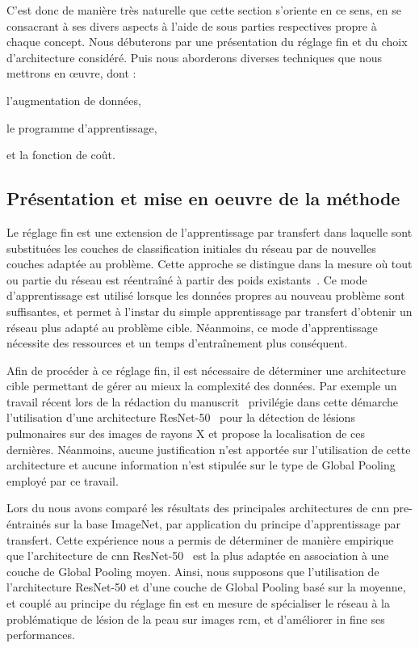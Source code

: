 C'est donc de manière très naturelle que cette section s'oriente en ce sens, en se consacrant à ses divers aspects à l'aide de sous parties respectives propre à chaque concept. Nous débuterons par une présentation du réglage fin et du choix d'architecture considéré. Puis nous aborderons diverses techniques que nous mettrons en œuvre, dont :
\begin{inlinerate}
    \item l'augmentation de données,
    \item le programme d'apprentissage,
    \item et la fonction de coût.
\end{inlinerate}\par

\subsection{Présentation et mise en oeuvre de la méthode}
Le réglage fin est une extension de l'apprentissage par transfert dans laquelle sont substituées les couches de classification initiales du réseau par de nouvelles couches adaptée au problème. Cette approche se distingue dans la mesure où tout ou partie du réseau est réentraîné à partir des poids existants~\cite{Tajbakhsh2016}. Ce mode d'apprentissage est utilisé lorsque les données propres au nouveau problème sont suffisantes, et permet à l'instar du simple apprentissage par transfert d'obtenir un réseau plus adapté au problème cible. Néanmoins, ce mode d'apprentissage nécessite des ressources et un temps d'entraînement plus conséquent.\par

Afin de procéder à ce réglage fin, il est nécessaire de déterminer une architecture cible permettant de gérer au mieux la complexité des données. Par exemple un travail récent lors de la rédaction du manuscrit~\cite{Park2019} privilégie dans cette démarche l'utilisation d'une architecture ResNet-50~\cite{He2016} pour la détection de lésions pulmonaires sur des images de rayons X et propose la localisation de ces dernières. Néanmoins, aucune justification n'est apportée sur l'utilisation de cette architecture et aucune information n'est stipulée sur le type de Global Pooling employé par ce travail.\par

Lors du  nous avons comparé les résultats des principales architectures de \gls{cnn} pre-éntrainés sur la base ImageNet, par application du principe d'apprentissage par transfert. Cette expérience nous a permis de déterminer de manière empirique que l'architecture de \gls{cnn} ResNet-50~\cite{He2016} est la plus adaptée en association à une couche de Global Pooling moyen. Ainsi, nous supposons que l'utilisation de l'architecture ResNet-50 et d'une couche de Global Pooling basé sur la moyenne, et couplé au principe du réglage fin est en mesure de spécialiser le réseau à la problématique de lésion de la peau sur images \gls{rcm}, et d'améliorer in fine ses performances.\par

